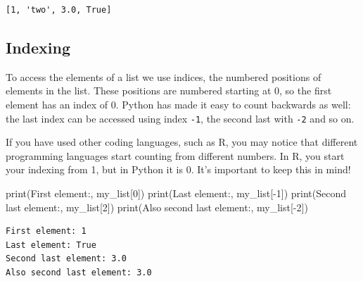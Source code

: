 \documentclass[
  letterpaper,
  DIV=11,
  numbers=noendperiod]{scrreprt}
\newenvironment{Shaded}{\begin{snugshade}}{\end{snugshade}}
\newcommand{\BuiltInTok}[1]{\textcolor[rgb]{0.00,0.23,0.31}{#1}}
\newcommand{\DecValTok}[1]{\textcolor[rgb]{0.68,0.00,0.00}{#1}}
\newcommand{\NormalTok}[1]{\textcolor[rgb]{0.00,0.23,0.31}{#1}}
\newcommand{\OperatorTok}[1]{\textcolor[rgb]{0.37,0.37,0.37}{#1}}
\newcommand{\StringTok}[1]{\textcolor[rgb]{0.13,0.47,0.30}{#1}}
\begin{document}
\begin{verbatim}
[1, 'two', 3.0, True]
\end{verbatim}

\hypertarget{indexing}{%
\subsection{Indexing}\label{indexing}}

To access the elements of a list we use indices, the numbered positions
of elements in the list. These positions are numbered starting at 0, so
the first element has an index of 0. Python has made it easy to count
backwards as well: the last index can be accessed using index
\texttt{-1}, the second last with \texttt{-2} and so on.

\begin{tcolorbox}[enhanced jigsaw, rightrule=.15mm, opacitybacktitle=0.6, colback=white, toprule=.15mm, colframe=quarto-callout-tip-color-frame, bottomtitle=1mm, bottomrule=.15mm, arc=.35mm, coltitle=black, breakable, title=\textcolor{quarto-callout-tip-color}{\faLightbulb}\hspace{0.5em}{0-Based Indexing!}, titlerule=0mm, opacityback=0, colbacktitle=quarto-callout-tip-color!10!white, left=2mm, toptitle=1mm, leftrule=.75mm]
If you have used other coding languages, such as R, you may notice that
different programming languages start counting from different numbers.
In R, you start your indexing from 1, but in Python it is 0. It's
important to keep this in mind!
\end{tcolorbox}

\begin{Shaded}
\begin{Highlighting}[]
\BuiltInTok{print}\NormalTok{(}\StringTok{\textquotesingle{}First element:\textquotesingle{}}\NormalTok{, my\_list[}\DecValTok{0}\NormalTok{])}
\BuiltInTok{print}\NormalTok{(}\StringTok{\textquotesingle{}Last element:\textquotesingle{}}\NormalTok{, my\_list[}\OperatorTok{{-}}\DecValTok{1}\NormalTok{])}
\BuiltInTok{print}\NormalTok{(}\StringTok{\textquotesingle{}Second last element:\textquotesingle{}}\NormalTok{, my\_list[}\DecValTok{2}\NormalTok{])}
\BuiltInTok{print}\NormalTok{(}\StringTok{\textquotesingle{}Also second last element:\textquotesingle{}}\NormalTok{, my\_list[}\OperatorTok{{-}}\DecValTok{2}\NormalTok{])}
\end{Highlighting}
\end{Shaded}

\begin{verbatim}
First element: 1
Last element: True
Second last element: 3.0
Also second last element: 3.0
\end{verbatim}
\end{document}
